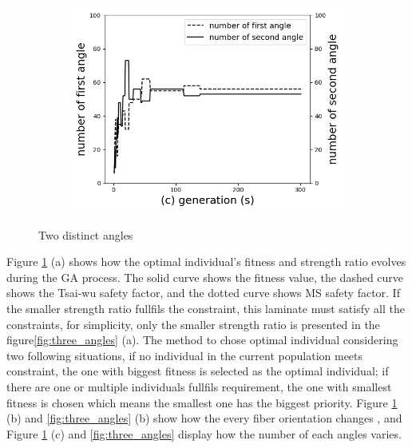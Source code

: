 {\begin{figure}[!htb]
		\begin{subfigure}[b]{0.8\linewidth}
			\includegraphics[width=\linewidth]{Figures/chapter4_second_two_distinct_angler_number_change.png}
		\end{subfigure}
	\caption{Two distinct angles}
	\label{fig:two_angles}
\end{figure}
\clearpage
}


Figure \ref{fig:two_angles} (a) shows how the optimal individual's fitness and
strength ratio evolves during the GA process. The solid curve shows the fitness
value, the dashed curve shows the Tsai-wu safety factor, and the dotted curve
shows MS safety factor. If the smaller strength ratio fullfils the constraint,
this laminate must satisfy all the constraints, for simplicity, only the smaller
strength ratio is presented in the figure\ref{fig:three_angles} (a). The method
to chose optimal individual considering two following situations, if no
individual in the current population meets constraint, the one with biggest
fitness is selected as the optimal individual; if there are one or multiple
individuals fullfils requirement, the one with smallest fitness is chosen which
means the smallest one has the biggest priority.  Figure \ref{fig:two_angles}
(b) and \ref{fig:three_angles} (b) show how the every fiber orientation changes , and
Figure \ref{fig:two_angles} (c) and \ref{fig:three_angles} display how the
number of each angles varies.

